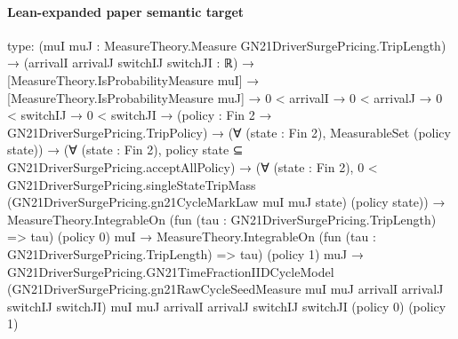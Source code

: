 \documentclass[10pt]{article}
\begin{document}
\paragraph{Lean-expanded paper semantic target}
\begin{ReviewVerbatim}
type:
(muI muJ : MeasureTheory.Measure GN21DriverSurgePricing.TripLength) →
  (arrivalI arrivalJ switchIJ switchJI : ℝ) →
    [MeasureTheory.IsProbabilityMeasure muI] →
      [MeasureTheory.IsProbabilityMeasure muJ] →
        0 < arrivalI →
          0 < arrivalJ →
            0 < switchIJ →
              0 < switchJI →
                (policy : Fin 2 → GN21DriverSurgePricing.TripPolicy) →
                  (∀ (state : Fin 2), MeasurableSet (policy state)) →
                    (∀ (state : Fin 2), policy state ⊆ GN21DriverSurgePricing.acceptAllPolicy) →
                      (∀ (state : Fin 2),
                          0 <
                            GN21DriverSurgePricing.singleStateTripMass
                              (GN21DriverSurgePricing.gn21CycleMarkLaw muI muJ state) (policy state)) →
                        MeasureTheory.IntegrableOn (fun (tau : GN21DriverSurgePricing.TripLength) => tau) (policy 0)
                            muI →
                          MeasureTheory.IntegrableOn (fun (tau : GN21DriverSurgePricing.TripLength) => tau) (policy 1)
                              muJ →
                            GN21DriverSurgePricing.GN21TimeFractionIIDCycleModel
                              (GN21DriverSurgePricing.gn21RawCycleSeedMeasure muI muJ arrivalI arrivalJ switchIJ
                                switchJI)
                              muI muJ arrivalI arrivalJ switchIJ switchJI (policy 0) (policy 1)


\end{ReviewVerbatim}
\end{document}
